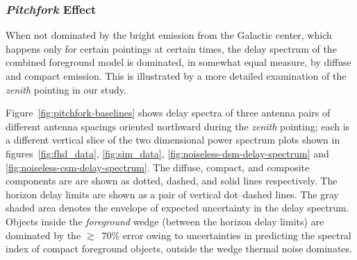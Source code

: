 \documentclass[preprint2,iop,numberedappendix]{emulateapj}
\begin{document}
\subsubsection{{\it Pitchfork} Effect}\label{sec:pitchfork}

When not dominated by the bright emission from the Galactic center, which happens only for certain pointings at certain times, the delay spectrum of the combined foreground model is dominated, in somewhat equal measure, by diffuse and compact emission. This is illustrated by a more detailed examination of the {\it zenith} pointing in our study. 

Figure~\ref{fig:pitchfork-baselines} shows delay spectra of three antenna pairs of different antenna spacings oriented northward during the {\it zenith} pointing; each is a different vertical slice of the two dimensional power spectrum plots shown in figures~\ref{fig:fhd_data}, \ref{fig:sim_data}, \ref{fig:noiseless-dsm-delay-spectrum} and \ref{fig:noiseless-csm-delay-spectrum}. The diffuse, compact, and composite components are are shown as dotted, dashed, and solid lines respectively. The horizon delay limits are shown as a pair of vertical dot--dashed lines. The gray shaded area denotes the envelope of expected uncertainty in the delay spectrum. Objects inside the {\it foreground} wedge (between the horizon delay limits) are dominated by the $\gtrsim$~70\% error owing to uncertainties in predicting the spectral index of compact foreground objects, outside the wedge thermal noise dominates. 
\end{document}

